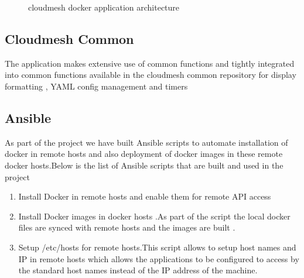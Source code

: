 \documentclass[9pt,twocolumn,twoside]{../../styles/osajnl}
\begin{document}
\begin{figure}[htbp]
\centering
{}
\caption{cloudmesh docker application architecture}
\label{fig:Arch}
\end{figure}

\subsection{Cloudmesh Common}

The application makes extensive use of common functions and tightly integrated into common functions available in the cloudmesh common repository for display formatting , YAML config management and timers

\subsection{Ansible}

As part of the project we have built Ansible\cite{www-Ansible} scripts to automate installation of docker in remote hosts and also deployment of docker images in these remote docker hosts.Below is the list of Ansible scripts that are built and used in the project 
\begin{enumerate}
\item Install Docker in remote hosts and enable them for remote API access
\item Install Docker images in docker hosts .As part of the script the local docker files are synced with remote hosts and the images are built .
\item Setup /etc/hosts for remote hosts.This script allows to setup host names and IP in remote hosts which allows the applications to be configured to access by the standard host names instead of the IP address of the machine.
\end{enumerate}
\end{document}
